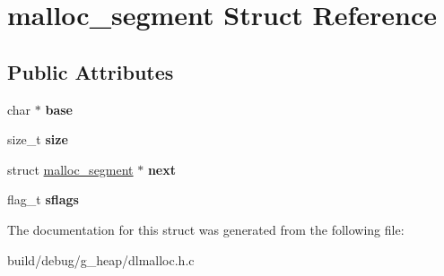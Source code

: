 \hypertarget{structmalloc__segment}{\section{malloc\-\_\-segment Struct Reference}
\label{structmalloc__segment}
}
\subsection*{Public Attributes}
\begin{DoxyCompactItemize}
\item 
\hypertarget{structmalloc__segment_a7da2460993ce3185e2793d3517f69ad8}{char $\ast$ {\bfseries base}}\label{structmalloc__segment_a7da2460993ce3185e2793d3517f69ad8}

\item 
\hypertarget{structmalloc__segment_a392a23ee3bd7a167e5f6382793a8eba1}{size\-\_\-t {\bfseries size}}\label{structmalloc__segment_a392a23ee3bd7a167e5f6382793a8eba1}

\item 
\hypertarget{structmalloc__segment_a0021ca9aec34db3b863f336bee7c365b}{struct \hyperlink{structmalloc__segment}{malloc\-\_\-segment} $\ast$ {\bfseries next}}\label{structmalloc__segment_a0021ca9aec34db3b863f336bee7c365b}

\item 
\hypertarget{structmalloc__segment_ac48f17d9495d732749db6544cabbec2c}{flag\-\_\-t {\bfseries sflags}}\label{structmalloc__segment_ac48f17d9495d732749db6544cabbec2c}

\end{DoxyCompactItemize}


The documentation for this struct was generated from the following file\-:\begin{DoxyCompactItemize}
\item 
build/debug/g\-\_\-heap/dlmalloc.\-h.\-c\end{DoxyCompactItemize}
